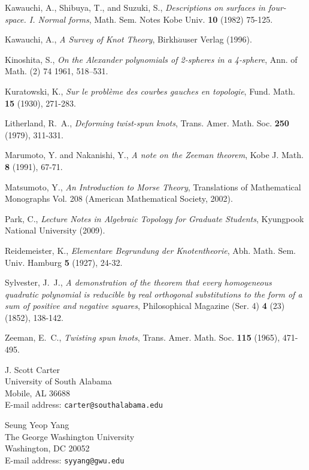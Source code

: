 \documentclass{amsart}
\theoremstyle{definition}
\theoremstyle{remark}
\numberwithin{equation}{section}
\begin{document}
\begin{thebibliography}{99}
 Kawauchi, A., Shibuya, T., and Suzuki, S., \emph{Descriptions on surfaces in four-space. I. Normal forms}, Math. Sem. Notes Kobe Univ. {\bf 10} (1982) 75-125.

 Kawauchi, A., \emph{A Survey of Knot Theory}, Birkh$\ddot{a}$user Verlag (1996).

 Kinoshita, S., \emph{On the Alexander polynomials of 2-spheres in a 4-sphere}, Ann. of Math. (2) 74 1961, 518--531.

 Kuratowski, K., \emph{Sur le probl\`{e}me des courbes gauches en topologie}, Fund. Math. {\bf 15} (1930), 271-283.

 Litherland, R.~A., \emph{Deforming twist-spun knots}, Trans. Amer. Math. Soc. {\bf 250} (1979), 311-331.



 Marumoto, Y. and Nakanishi, Y., \emph{A note on the Zeeman theorem}, Kobe J. Math. {\bf 8} (1991), 67-71.


 Matsumoto, Y., \emph{An Introduction to Morse Theory}, Translations of Mathematical Monographs Vol. 208 (American Mathematical Society, 2002).


 Park, C., \emph{Lecture Notes in Algebraic Topology for Graduate Students}, Kyungpook National University (2009).


 Reidemeister, K., \emph{Elementare Begrundung der Knotentheorie}, Abh. Math. Sem. Univ. Hamburg {\bf 5} (1927), 24-32.




 Sylvester, J.~J., \emph{A demonstration of the theorem that every homogeneous quadratic polynomial is reducible by real orthogonal substitutions to the form of a sum of positive and negative squares}, Philosophical Magazine (Ser. 4) {\bf 4} (23) (1852), 138-142.








 Zeeman, E.~C., \emph{Twisting spun knots}, Trans. Amer. Math. Soc. {\bf 115} (1965), 471-495.
\end{thebibliography}



\begin{flushleft}
J. Scott Carter \\  
University of South Alabama \\ 
Mobile, AL 36688 \\
E-mail address: {\tt carter@southalabama.edu} 
\end{flushleft}

\begin{flushleft}
Seung Yeop Yang \\ 
The George Washington University \\ 
Washington, DC 20052 \\
E-mail address: {\tt  syyang@gwu.edu}
\end{flushleft}
\end{document}
